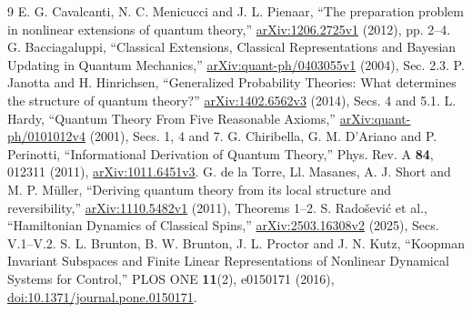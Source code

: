 \documentclass[11pt,a4paper]{article}
\begin{document}
\begin{thebibliography}{9}
 E. G. Cavalcanti, N. C. Menicucci and J. L. Pienaar,
``The preparation problem in nonlinear extensions of quantum theory,''
\href{https://arxiv.org/abs/1206.2725v1}{arXiv:1206.2725v1} (2012), pp. 2--4.
 G. Bacciagaluppi, ``Classical Extensions, Classical
Representations and Bayesian Updating in Quantum Mechanics,''
\href{https://arxiv.org/abs/quant-ph/0403055v1}{arXiv:quant-ph/0403055v1}
(2004), Sec. 2.3.
 P. Janotta and H. Hinrichsen, ``Generalized Probability
Theories: What determines the structure of quantum theory?''
\href{https://arxiv.org/abs/1402.6562v3}{arXiv:1402.6562v3} (2014),
Secs. 4 and 5.1.
 L. Hardy, ``Quantum Theory From Five Reasonable Axioms,''
\href{https://arxiv.org/abs/quant-ph/0101012v4}{arXiv:quant-ph/0101012v4}
(2001), Secs. 1, 4 and 7.
 G. Chiribella, G. M. D'Ariano and P. Perinotti,
``Informational Derivation of Quantum Theory,'' Phys. Rev. A \textbf{84},
012311 (2011), \href{https://arxiv.org/abs/1011.6451v3}{arXiv:1011.6451v3}.
 G. de la Torre, Ll. Masanes, A. J. Short and M. P. M\"uller,
``Deriving quantum theory from its local structure and reversibility,''
\href{https://arxiv.org/abs/1110.5482v1}{arXiv:1110.5482v1} (2011),
Theorems 1--2.
 S. Rado\v{s}evi\'c et al., ``Hamiltonian Dynamics of Classical
Spins,'' \href{https://arxiv.org/abs/2503.16308v2}{arXiv:2503.16308v2}
(2025), Secs. V.1--V.2.
 S. L. Brunton, B. W. Brunton, J. L. Proctor and J. N. Kutz,
``Koopman Invariant Subspaces and Finite Linear Representations of Nonlinear
Dynamical Systems for Control,'' PLOS ONE \textbf{11}(2), e0150171 (2016),
\href{https://doi.org/10.1371/journal.pone.0150171}{doi:10.1371/journal.pone.0150171}.
\end{thebibliography}
\end{document}
